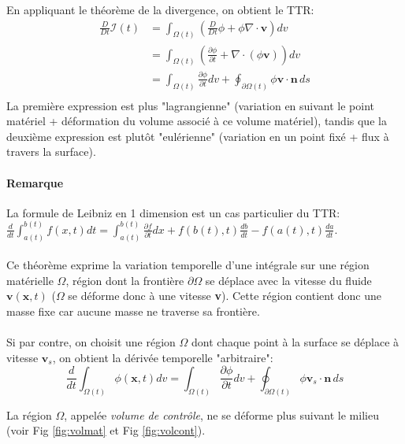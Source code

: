 En appliquant le théorème de la divergence, on obtient le TTR:
$$\boxed{
\begin{aligned}
\frac{D}{Dt}\mathcal{I}(t) &=\int_{\Omega (t)}\left(\frac{D}{Dt}\phi+\phi\nabla\cdot\textbf{v}\right)dv\qquad\\ 
 & =\int_{\Omega (t)}\left(\frac{\partial \phi}{\partial t}+\nabla\cdot(\phi\textbf{v})\right)dv\\
 & = \int_{\Omega (t)}\frac{\partial\phi}{\partial t}dv+\oint_{\partial \Omega (t)}\phi\textbf{v}\cdot\textbf{\^n}\,ds\\
\end{aligned}}$$
La première expression est plus "lagrangienne" (variation en suivant le point matériel + déformation du volume associé à ce volume matériel), tandis que la deuxième expression est plutôt "eulérienne" (variation en un point fixé + flux à travers la surface).
\paragraph{Remarque} La formule de Leibniz en 1 dimension est un cas particulier du TTR: $\frac{d}{dt}\int_{a(t)}^{b(t)}f(x,t)dt=\int_{a(t)}^{b(t)}\frac{\partial f}{\partial t}dx+f(b(t),t)\frac{db}{dt}-f(a(t),t)\frac{da}{dt}.$
\paragraph{}
Ce théorème exprime la variation temporelle d'une intégrale sur une région matérielle $\Omega$, région dont la frontière $\partial \Omega$ se déplace avec la vitesse du fluide $\textbf{v}(\textbf{x},t)$ ($\Omega$ se déforme donc à une vitesse \textbf{v}). Cette région contient donc une masse fixe car aucune masse ne traverse sa frontière.
\paragraph{}
Si par contre, on choisit une région $\Omega$ dont chaque point à la surface se déplace à vitesse $\textbf{v}_s$, on obtient la dérivée temporelle "arbitraire": 
\begin{equation}
\frac{d}{dt}\int_{\Omega (t)}\phi(\textbf{x},t)dv=\int_{\Omega (t)}\frac{\partial \phi}{\partial t}dv+\oint_{\partial \Omega (t)}\phi\textbf{v}_s\cdot \textbf{\^n}\,ds
\end{equation}

La région $\Omega$, appelée \emph{volume de contrôle}, ne se déforme plus suivant le milieu (voir Fig \ref{fig:volmat} et Fig \ref{fig:volcont}).

